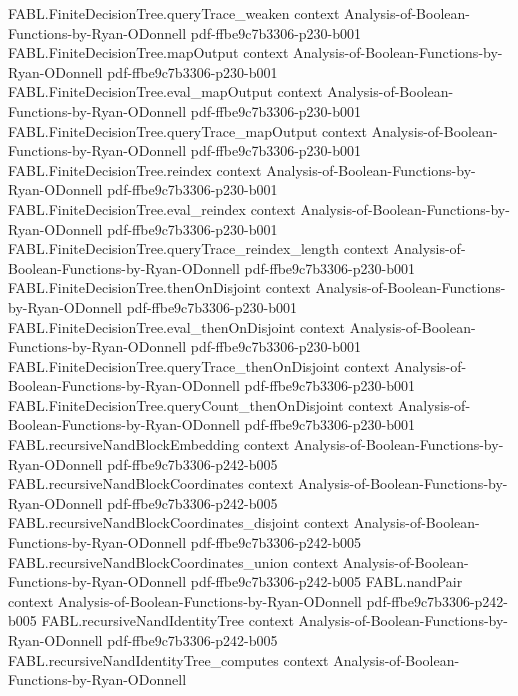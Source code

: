 \begin{theorem}
  {FABL.FiniteDecisionTree.queryTrace_weaken}
  {context}
  {Analysis-of-Boolean-Functions-by-Ryan-ODonnell}
  {pdf-ffbe9c7b3306-p230-b001}
\proofstep
  {FABL.FiniteDecisionTree.mapOutput}
  {context}
  {Analysis-of-Boolean-Functions-by-Ryan-ODonnell}
  {pdf-ffbe9c7b3306-p230-b001}
\proofstep
  {FABL.FiniteDecisionTree.eval_mapOutput}
  {context}
  {Analysis-of-Boolean-Functions-by-Ryan-ODonnell}
  {pdf-ffbe9c7b3306-p230-b001}
\proofstep
  {FABL.FiniteDecisionTree.queryTrace_mapOutput}
  {context}
  {Analysis-of-Boolean-Functions-by-Ryan-ODonnell}
  {pdf-ffbe9c7b3306-p230-b001}
\proofstep
  {FABL.FiniteDecisionTree.reindex}
  {context}
  {Analysis-of-Boolean-Functions-by-Ryan-ODonnell}
  {pdf-ffbe9c7b3306-p230-b001}
\proofstep
  {FABL.FiniteDecisionTree.eval_reindex}
  {context}
  {Analysis-of-Boolean-Functions-by-Ryan-ODonnell}
  {pdf-ffbe9c7b3306-p230-b001}
\proofstep
  {FABL.FiniteDecisionTree.queryTrace_reindex_length}
  {context}
  {Analysis-of-Boolean-Functions-by-Ryan-ODonnell}
  {pdf-ffbe9c7b3306-p230-b001}
\proofstep
  {FABL.FiniteDecisionTree.thenOnDisjoint}
  {context}
  {Analysis-of-Boolean-Functions-by-Ryan-ODonnell}
  {pdf-ffbe9c7b3306-p230-b001}
\proofstep
  {FABL.FiniteDecisionTree.eval_thenOnDisjoint}
  {context}
  {Analysis-of-Boolean-Functions-by-Ryan-ODonnell}
  {pdf-ffbe9c7b3306-p230-b001}
\proofstep
  {FABL.FiniteDecisionTree.queryTrace_thenOnDisjoint}
  {context}
  {Analysis-of-Boolean-Functions-by-Ryan-ODonnell}
  {pdf-ffbe9c7b3306-p230-b001}
\proofstep
  {FABL.FiniteDecisionTree.queryCount_thenOnDisjoint}
  {context}
  {Analysis-of-Boolean-Functions-by-Ryan-ODonnell}
  {pdf-ffbe9c7b3306-p230-b001}
\proofstep
  {FABL.recursiveNandBlockEmbedding}
  {context}
  {Analysis-of-Boolean-Functions-by-Ryan-ODonnell}
  {pdf-ffbe9c7b3306-p242-b005}
\proofstep
  {FABL.recursiveNandBlockCoordinates}
  {context}
  {Analysis-of-Boolean-Functions-by-Ryan-ODonnell}
  {pdf-ffbe9c7b3306-p242-b005}
\proofstep
  {FABL.recursiveNandBlockCoordinates_disjoint}
  {context}
  {Analysis-of-Boolean-Functions-by-Ryan-ODonnell}
  {pdf-ffbe9c7b3306-p242-b005}
\proofstep
  {FABL.recursiveNandBlockCoordinates_union}
  {context}
  {Analysis-of-Boolean-Functions-by-Ryan-ODonnell}
  {pdf-ffbe9c7b3306-p242-b005}
\proofstep
  {FABL.nandPair}
  {context}
  {Analysis-of-Boolean-Functions-by-Ryan-ODonnell}
  {pdf-ffbe9c7b3306-p242-b005}
\proofstep
  {FABL.recursiveNandIdentityTree}
  {context}
  {Analysis-of-Boolean-Functions-by-Ryan-ODonnell}
  {pdf-ffbe9c7b3306-p242-b005}
\proofstep
  {FABL.recursiveNandIdentityTree_computes}
  {context}
  {Analysis-of-Boolean-Functions-by-Ryan-ODonnell}

\end{theorem}
